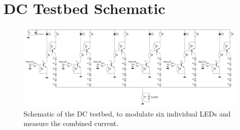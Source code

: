 
\chapter{DC Testbed Schematic}
\label{app:dc-test-bed-schematic}

\begin{figure}[htb]
	\includegraphics[angle=90,width=\textwidth,height=\textheight,keepaspectratio]{chapters/appendix/dc-test-bed/dc-test-bed-schematic.jpg}
	\caption{Schematic of the DC testbed, to modulate six individual LEDs and measure the combined current.}
	\label{fig:dc-test-bed-schematic}
\end{figure}


